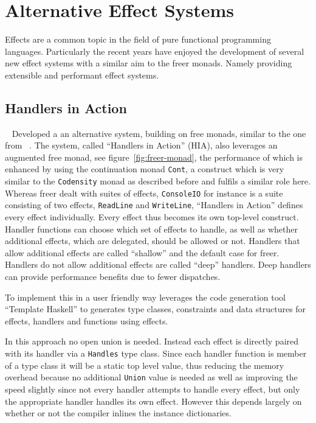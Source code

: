 \section{Alternative Effect Systems}

\label{sec:alternative-systems}

Effects are a common topic in the field of pure functional programming
languages. Particularly the recent years have enjoyed the development of several
new effect systems with a similar aim to the freer monads. Namely providing
extensible and performant effect systems.

\subsection{Handlers in Action}

\citeauthor{hia}~\cite{hia} Developed a an alternative system, building on free
monads, similar to the one from \citeauthor{freer}~\cite{freer}. The system,
called ``Handlers in Action'' (HIA), also leverages an augmented free monad, see
figure~\ref{fig:freer-monad}, the performance of which is enhanced by using the
continuation monad \texttt{Cont}, a construct which is very similar to the
\texttt{Codensity} monad as described before and fulfils a similar role here.
Whereas freer dealt with suites of effects, \texttt{ConsoleIO} for instance is
a suite consisting of two effects, \texttt{ReadLine} and \texttt{WriteLine},
``Handlers in Action'' defines every effect individually. Every effect thus
becomes its own top-level construct. Handler functions can choose which set of
effects to handle, as well as whether additional effects, which are delegated,
should be allowed or not. Handlers that allow additional effects are called
``shallow'' and the default case for freer. Handlers do not allow additional
effects are called ``deep'' handlers. Deep handlers can provide performance
benefits due to fewer dispatches.

To implement this in a user friendly way \citeauthor{hia} leverages the code
generation tool ``Template Haskell'' to generates type classes, constraints and
data structures for effects, handlers and functions using effects.

In this approach no open union is needed. Instead each effect is directly paired
with its handler via a \texttt{Handles} type class. Since each handler function
is member of a type class it will be a static top level value, thus reducing the
memory overhead because no additional \texttt{Union} value is needed as well as
improving the speed slightly since not every handler attempts to handle every
effect, but only the appropriate handler handles its own effect. However this
depends largely on whether or not the compiler inlines the instance
dictionaries.

